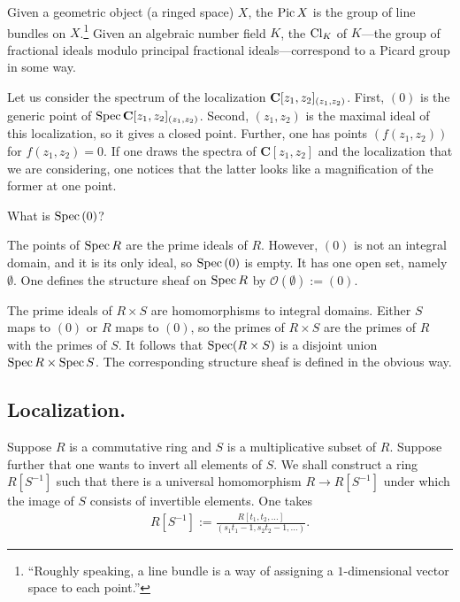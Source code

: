 \documentclass [11 pt, oneside] {article}
\begin{document}
\begin{remark}
	Given a geometric object (a ringed space) $X$, the  $\operatorname{Pic} X$ is the group of line bundles on $X$.\footnote{``Roughly speaking, a line bundle is a way of assigning a $1$-dimensional vector space to each point.''} Given an algebraic number field $K$, the  $\operatorname{Cl}_K$ of $K$---the group of fractional ideals modulo principal fractional ideals---correspond to a Picard group in some way.
\end{remark}

\begin{example}[ ]\label{}\text{}
Let us consider the spectrum of the localization $\mathbf C[z_1,z_2]_{(z_1,z_2)}$. First, $(0)$ is the generic point of $\operatorname{Spec} \mathbf C[z_1,z_2]_{(z_1,z_2)}$. Second, $(z_1,z_2)$ is the maximal ideal of this localization, so it gives a closed point. Further, one has points $(f(z_1,z_2))$ for $f(z_1,z_2)=0$. If one draws the spectra of $\mathbf{C}[z_1,z_2]$ and the localization that we are considering, one notices that the latter looks like a magnification of the former at one point.
\end{example}

\begin{problem}
	What is $\operatorname{Spec} \text{}(0)$?
\end{problem}

The points of $\operatorname{Spec} R$ are the prime ideals of $R$. However, $(0)$ is not an integral domain, and it is its only ideal, so $\operatorname{Spec} \text{}(0)$ is empty. It has one open set, namely $\emptyset$. One defines the structure sheaf on $\operatorname{Spec} R$ by $\mathscr{O}(\emptyset) :=  (0)$.

\begin{example}
	The prime ideals of $R\times S$ are homomorphisms to integral domains. Either $S$ maps to $(0)$ or $R$ maps to $(0)$, so the primes of $R\times S$ are the primes of $R$ with the primes of $S$. It follows that $\operatorname{Spec} (R\times S)$ is a disjoint union $\operatorname{Spec} R\times \operatorname{Spec} S$. The corresponding structure sheaf is defined in the obvious way.
\end{example}

\subsection{Localization.}
Suppose $R$ is a commutative ring and $S$ is a multiplicative subset of $R$. Suppose further that one wants to invert all elements of $S$. We shall construct a ring $R[S^{-1}]$ such that there is a universal homomorphism $R\longrightarrow R[S^{-1}]$ under which the image of $S$ consists of invertible elements. One takes
\begin{align*}
	R[S^{-1}] := \frac{R[t_1,t_2,\hdots]}{(s_1t_1-1,s_2t_2-1,\hdots)}.
\end{align*}
\end{document}
